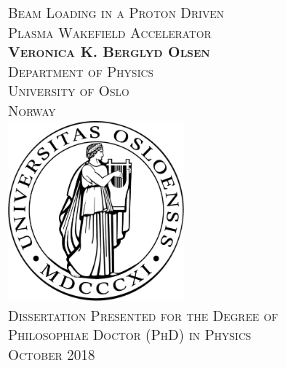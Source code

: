 \begin{titlepage}
    \begin{center}
        \vspace*{10mm}
        \huge
        \scshape
        Beam Loading in a Proton Driven\\
        Plasma Wakefield Accelerator\\
        \vspace{20mm}
        \large
        \upshape
        \textbf{Veronica K. Berglyd Olsen}\\
        Department of Physics\\
        University of Oslo\\
        Norway\\
        \vfill
        \includegraphics[width=0.35\textwidth]{images/UiOLogo.pdf}\\
        \vspace{20mm}
        Dissertation Presented for the Degree of\\
        Philosophiae Doctor (PhD) in Physics\\
        \vspace{10mm}
        \large{October 2018}
    \end{center}
\end{titlepage}
